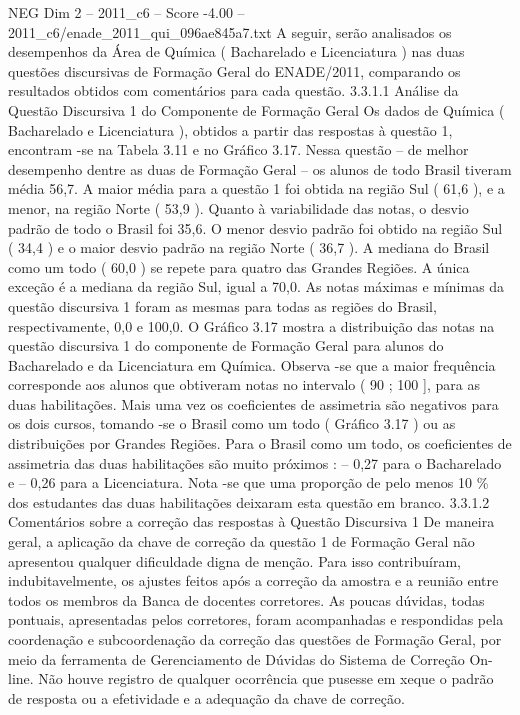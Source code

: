 \begin{textsample}{NEG Dim 2 – 2011\_c6 – Score -4.00 – 2011\_c6/enade\_2011\_qui\_096ae845a7.txt}
A seguir, serão analisados os desempenhos da Área de Química ( Bacharelado e Licenciatura ) nas duas questões discursivas de Formação Geral do ENADE/2011, comparando os resultados obtidos com comentários para cada questão. 3.3.1.1 Análise da Questão Discursiva 1 do Componente de Formação Geral Os dados de Química ( Bacharelado e Licenciatura ), obtidos a partir das respostas à questão 1, encontram -se na Tabela 3.11 e no Gráfico 3.17.
Nessa questão – de melhor desempenho dentre as duas de Formação Geral – os alunos de todo Brasil tiveram média 56,7.
A maior média para a questão 1 foi obtida na região Sul ( 61,6 ), e a menor, na região Norte ( 53,9 ).
Quanto à variabilidade das notas, o desvio padrão de todo o Brasil foi 35,6.
O menor desvio padrão foi obtido na região Sul ( 34,4 ) e o maior desvio padrão na região Norte ( 36,7 ).
A mediana do Brasil como um todo ( 60,0 ) se repete para quatro das Grandes Regiões.
A única exceção é a mediana da região Sul, igual a 70,0.
As notas máximas e mínimas da questão discursiva 1 foram as mesmas para todas as regiões do Brasil, respectivamente, 0,0 e 100,0.
O Gráfico 3.17 mostra a distribuição das notas na questão discursiva 1 do componente de Formação Geral para alunos do Bacharelado e da Licenciatura em Química.
Observa -se que a maior frequência corresponde aos alunos que obtiveram notas no intervalo ( 90 ; 100 ], para as duas habilitações.
Mais uma vez os coeficientes de assimetria são negativos para os dois cursos, tomando -se o Brasil como um todo ( Gráfico 3.17 ) ou as distribuições por Grandes Regiões.
Para o Brasil como um todo, os coeficientes de assimetria das duas habilitações são muito próximos : – 0,27 para o Bacharelado e – 0,26 para a Licenciatura.
Nota -se que uma proporção de pelo menos 10 \% dos estudantes das duas habilitações deixaram esta questão em branco. 3.3.1.2 Comentários sobre a correção das respostas à Questão Discursiva 1 De maneira geral, a aplicação da chave de correção da questão 1 de Formação Geral não apresentou qualquer dificuldade digna de menção.
Para isso contribuíram, indubitavelmente, os ajustes feitos após a correção da amostra e a reunião entre todos os membros da Banca de docentes corretores.
As poucas dúvidas, todas pontuais, apresentadas pelos corretores, foram acompanhadas e respondidas pela coordenação e subcoordenação da correção das questões de Formação Geral, por meio da ferramenta de Gerenciamento de Dúvidas do Sistema de Correção On-line.
Não houve registro de qualquer ocorrência que pusesse em xeque o padrão de resposta ou a efetividade e a adequação da chave de correção.

\end{textsample}
